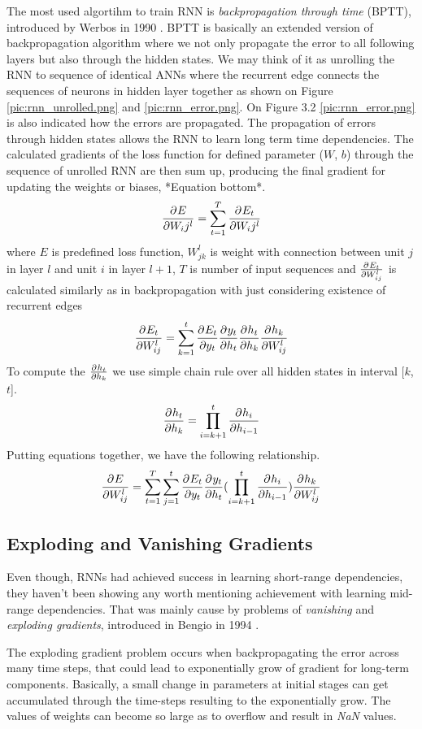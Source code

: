 The most used algortihm to train RNN is \textit{backpropagation through time} (BPTT), introduced by Werbos in 1990 \cite{werbos_bptt}.
BPTT is basically an extended version of backpropagation algorithm where we not only propagate the error to all following layers but also through the hidden states.
We may think of it as unrolling the RNN to sequence of identical ANNs where the recurrent edge connects the sequences of neurons in hidden layer together as shown on Figure \ref{pic:rnn_unrolled.png} and \ref{pic:rnn_error.png}.
On Figure 3.2 \ref{pic:rnn_error.png} is also indicated how the errors are propagated.
The propagation of errors through hidden states allows the RNN to learn long term time dependencies.
The calculated gradients of the loss function for defined parameter ($W$, $b$) through the sequence of unrolled RNN are then sum up, producing the final gradient for updating the weights or biases, *Equation bottom*.
\[ \frac{\partial^{} E}{\partial W_ij^l} = \sum_{t=1}^{T}\frac{\partial^{} E_t}{\partial W_ij^l} \]
where $E$ is predefined loss function, ${W_{jk}^l}$ is weight with connection between unit $j$ in layer $l$ and unit $i$ in layer $l+1$, $T$ is number of input sequences and $\frac{\partial^{} E_t}{\partial W_{ij}^l}$ is calculated similarly as in backpropagation with just considering existence of recurrent edges
\[ \frac{\partial^{} E_t}{\partial W_{ij}^l} = \sum_{k=1}^{t}\frac{\partial^{} E_t}{\partial y_t}\frac{\partial^{} y_t}{\partial h_t}\frac{\partial^{} h_t}{\partial h_k}\frac{\partial^{} h_k}{\partial W_{ij}^l} \]
To compute the $\frac{\partial^{} h_t}{\partial h_k}$ we use simple chain rule over all hidden states in interval [$k$,$t$].
\[ \frac{\partial^{} h_t}{\partial h_k} = \prod_{i=k+1}^{t}\frac{\partial^{} h_i}{\partial h_{i-1}} \]
Putting equations together, we have the following relationship\cite{rnn_dif}.
\[  \frac{\partial^{} E}{\partial W_{ij}^l} = \sum_{t=1}^{T}\sum_{j=1}^{t}\frac{\partial^{} E_t}{\partial y_t}\frac{\partial^{} y_t}{\partial h_t}(\prod_{i=k+1}^{t}\frac{\partial^{} h_i}{\partial h_{i-1}})\frac{\partial^{} h_k}{\partial W_{ij}^l} \]

\subsection{Exploding and Vanishing Gradients}

Even though, RNNs had achieved success in learning short-range dependencies, they haven’t been showing any worth mentioning achievement with learning mid-range dependencies.
That was mainly cause by problems of \textit{vanishing} and \textit{exploding gradients}, introduced in Bengio in 1994 \cite{vanishing_gradient}.

The exploding gradient problem occurs when backpropagating the error across many time steps, that could lead to exponentially grow of gradient for long-term components.
Basically, a small change in parameters at initial stages can get accumulated through the time-steps resulting to the exponentially
 grow.
The values of weights can become so large as to overflow and result in \textit{NaN} values.

